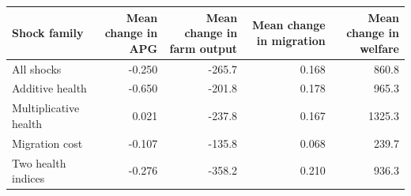 \begin{tabular}{lrrrr}
\hline
Shock family & Mean change in APG & Mean change in farm output & Mean change in migration & Mean change in welfare \\
\hline
All shocks & -0.250 & -265.7 & 0.168 & 860.8 \\
Additive health & -0.650 & -201.8 & 0.178 & 965.3 \\
Multiplicative health & 0.021 & -237.8 & 0.167 & 1325.3 \\
Migration cost & -0.107 & -135.8 & 0.068 & 239.7 \\
Two health indices & -0.276 & -358.2 & 0.210 & 936.3 \\
\hline
\end{tabular}
